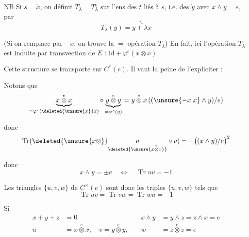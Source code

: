 \uline{NB} Si $s=\dot x$,  on définit $T_\lambda=T_\lambda^s$ sur l'ens des $t$ liés à $s$, i.e. des $\dot y$ avec $x\wedge y=e$, par
\[
 T_\lambda(y)=\dot{\overline{y+\lambda x}}
\]


(Si on remplace  par $-x$, on trouve la $=$ opération $T_\lambda$) En fait, ici  l'opération $T_\lambda$ est induite par  transvection de $E$ :  $\mathrm{id}+\varphi^e(x\otimes x)$

Cette structure se transporte sur $C^*(e)$. Il vaut la peine de l'expliciter :

Notons que
\[
 \underbrace{x\overset{e}{\otimes}x}_{=\varphi^e(\deleted{\unsure{x}}x)}
 \circ\underbrace{y\overset{e}{\otimes}y}_{=\varphi^e(y)}
 =y\overset{e}{\otimes}x\,((\unsure{-x|x}\wedge y)/e)
\]


donc
\[
 \operatorname{Tr}(\deleted{\unsure{x\otimes}}\underset{\deleted{\unsure{x\overset{e}{\otimes}x}}}{u}\circ v)
 =-\bigl((x\wedge y)/e\bigr)^2
\]


donc
\[
 x\wedge y=\pm e\quad\Longleftrightarrow\quad\boxed{\operatorname{Tr}uv=-1}
\]

Les triangles $\{u,v,w\}$ de $C^\times(e)$ sont donc les triples $\{u,v,w\}$ tels que
\[
 \operatorname{Tr}uv=\operatorname{Tr}vw=\operatorname{Tr}wu=-1
\]

Si 
\[
 \begin{aligned}
 x+y+z&=0 & x\wedge y&=y\wedge z=z\wedge x=e\\
 u&=x\overset{e}{\otimes}x,\quad v=y\overset{e}{\otimes}y,\quad & w&=z\overset{e}{\otimes}z=e
 \end{aligned}
\]

